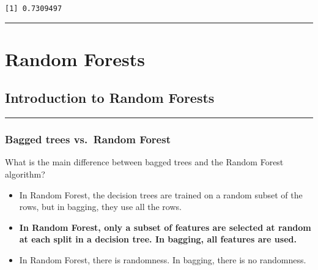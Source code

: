 \documentclass[
]{book}
\newenvironment{Shaded}{\begin{snugshade}}{\end{snugshade}}
\newcommand{\CommentTok}[1]{\textcolor[rgb]{0.56,0.35,0.01}{\textit{#1}}}
\newcommand{\NormalTok}[1]{#1}
\newcommand{\OperatorTok}[1]{\textcolor[rgb]{0.81,0.36,0.00}{\textbf{#1}}}
\newcommand{\StringTok}[1]{\textcolor[rgb]{0.31,0.60,0.02}{#1}}
\begin{document}
\begin{Shaded}
\end{Shaded}

\begin{verbatim}
[1] 0.7309497
\end{verbatim}

\begin{center}\rule{0.5\linewidth}{0.5pt}\end{center}

\hypertarget{random-forests}{%
\chapter{Random Forests}\label{random-forests}}

\hypertarget{introduction-to-random-forests}{%
\section{Introduction to Random Forests}\label{introduction-to-random-forests}}

\begin{center}\rule{0.5\linewidth}{0.5pt}\end{center}

\hypertarget{bagged-trees-vs.-random-forest}{%
\subsection{Bagged trees vs.~Random Forest}\label{bagged-trees-vs.-random-forest}}

What is the main difference between bagged trees and the Random Forest algorithm?

\begin{itemize}
\item
  In Random Forest, the decision trees are trained on a random subset of the rows, but in bagging, they use all the rows.
\item
  \textbf{In Random Forest, only a subset of features are selected at random at each split in a decision tree. In bagging, all features are used.}
\item
  In Random Forest, there is randomness. In bagging, there is no randomness.
\end{itemize}
\end{document}
